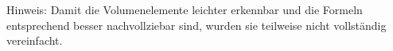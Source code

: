 \smallskip
Hinweis: Damit die Volumenelemente leichter erkennbar und die Formeln entsprechend besser nachvollziebar sind, wurden sie teilweise nicht vollständig vereinfacht.





        

